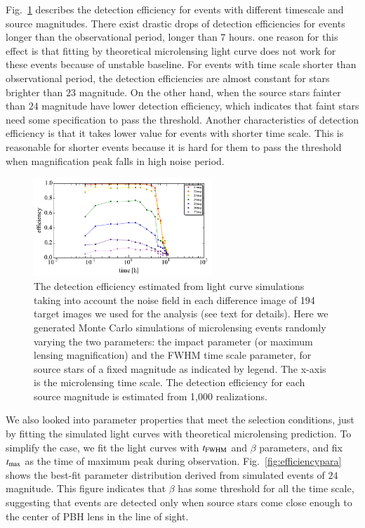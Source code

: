 \documentclass[iop, apj]{emulateapj}
\newcommand{\?}{\stackrel{?}{=}}
\begin{document}
\begin{itemize}
\begin{itemize}
	Fig.~\ref{fig:efficiencyeach} describes the detection efficiency for events with different 
	timescale and source magnitudes. 
	There exist drastic drops of detection efficiencies for events longer than the observational period, longer than 7 hours. 
	one reason for this effect is that fitting by theoretical microlensing light curve does not work for these events because of unstable baseline. 
	For events with time scale shorter than observational period, 
	the detection efficiencies are almost constant for stars brighter than $23$ magnitude. 
	On the other hand, when the source stars fainter than $24$ magnitude have lower detection efficiency, which indicates that 
	faint stars need some specification to pass the threshold. 
	Another characteristics of detection efficiency is that it takes lower value for events with shorter time scale. 
	This is reasonable for shorter events because 
	it is hard for them to pass the threshold when magnification peak falls in high noise period.  
%
\begin{figure}
\centering
\includegraphics[width=0.6\textwidth]{pic/efficiency_eachmag.pdf}
\caption{\small{ The detection efficiency estimated from light curve simulations taking into account the noise field in each difference image of 194 target images we used for the analysis (see text for details). Here we generated Monte Carlo simulations of microlensing events randomly varying the two parameters: the impact parameter (or maximum lensing magnification) and the FWHM time scale parameter, for source stars of a fixed magnitude as indicated by legend. The x-axis is the microlensing time scale. The detection efficiency for each source magnitude is estimated from 1,000 realizations.}}
\label{fig:efficiencyeach}
\end{figure}
%
	We also looked into parameter properties that meet the selection conditions, just by fitting the simulated light curves with theoretical microlensing prediction. To simplify the case, we fit the light curves with $t_{\rm FWHM}$ and $\beta$ parameters, and fix $t_{\rm max}$ as the time of maximum peak during observation.   
	Fig.~\ref{fig:efficiencypara} shows the best-fit parameter distribution derived from simulated events of $24$ magnitude. This figure indicates that $\beta$ has some threshold for all the time scale, suggesting that events are detected only when source stars come close enough to the center of PBH lens in the line of sight.  

\end{itemize}
\end{itemize}
\end{document}
